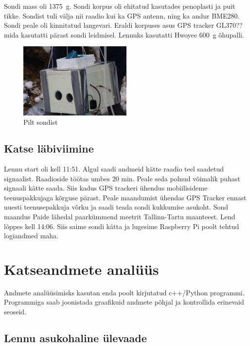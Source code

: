 \documentclass{trkut}%
\begin{document}
Sondi mass oli \SI{1375}{g}. Sondi korpus oli ehitatud kasutades penoplasti ja puit tikke. Sondist tuli välja nii raadio kui ka GPS antenn, ning ka andur BME280. Sondi peale oli kinnitatud langevari. Eraldi korpuses asus GPS tracker GL370?? mida kasutatti pärast sondi leidmisel. Lennuks kasutatti Hwoyee \SI{600}{g} õhupalli.

\begin{figure}[h]
	\includegraphics[width=0.5\textwidth]{PicGra/sond.jpg}
	\caption{Pilt sondist}
	\label{sond}%
\end{figure}




\section{Katse läbiviimine}
Lennu start oli kell 11:51. Algul saadi andmeid kätte raadio teel saadetud signaalist. Raadioside töötas umbes 20 min. Peale seda polnud võimalik puhast signaali kätte saada. Siis kadus GPS trackeri ühendus mobiilisideme teenuspakkujaga kõrguse pärast. Peale maandumist ühendas GPS Tracker ennast uuesti teenusepakkuja võrku ja saadi teada sondi kukkumise asukoht. Sond maandus Paide lähedal paarkümmend meetrit Tallinn-Tartu maanteest. Lend lõppes kell 14:06. Siis saime sondi kätta ja lugesime Raspberry Pi poolt tehtud logiandmed maha.



\chapter{Katseandmete analüüs}
Andmete analüüsimisks kasutan enda poolt kirjutatud c++/Python programmi. Programmiga saab joonistada graafikuid andmete põhjal ja kontrollida erinevaid seoseid.

\section{Lennu asukohaline ülevaade}
\end{document}
